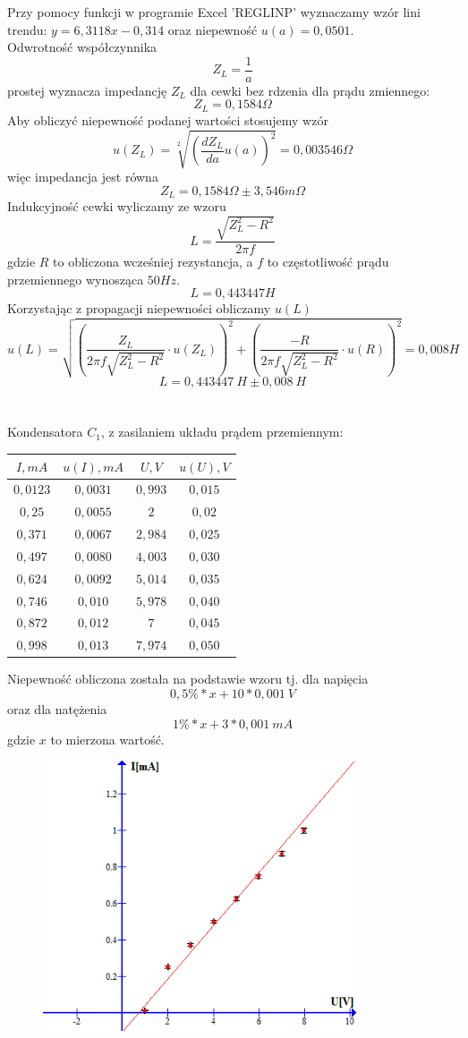 \documentclass{article}
\begin{document}
Przy pomocy funkcji w programie Excel 'REGLINP' wyznaczamy wzór lini trendu: $y = 6,3118x - 0,314$ oraz niepewność $u(a) = 0,0501$.\\
Odwrotność współczynnika 
$$Z_L = \frac{1}{a}$$
prostej wyznacza impedancję $Z_L$ dla cewki bez rdzenia dla prądu zmiennego:
$$Z_L = 0,1584 \Omega$$ 
Aby obliczyć niepewność podanej wartości stosujemy wzór
$$u(Z_L) = \sqrt[2]{(\frac{dZ_L}{da}u(a))^2} = 0,003546 \Omega$$
więc impedancja jest równa
$$Z_L = 0,1584 \Omega \pm 3,546 m \Omega$$
Indukcyjność cewki wyliczamy ze wzoru
$$L = \frac{\sqrt{Z_L^2-R^2}}{2\pi f}$$
gdzie $R$ to obliczona wcześniej rezystancja, a $f$ to częstotliwość prądu przemiennego wynosząca $50 Hz$.
$$L = 0,443447 H$$
Korzystając z propagacji niepewności obliczamy $u(L)$
$$u(L) = \sqrt{(\frac{Z_L}{2\pi f \sqrt{Z_L^2 - R^2}} \cdot u(Z_L))^2+(\frac{-R}{2\pi f \sqrt{Z_L^2-R^2}} \cdot u(R))^2} = 0,008 H$$
$$L = 0,443447\ H \pm 0,008\ H$$
\\\\
Kondensatora $C_1$, z zasilaniem układu prądem przemiennym:
\begin{center}
    \begin{tabular}{|c|c|c|c|}
    \hline
$I,mA$ & $u(I), mA$ & $U,V$ & $u(U), V$\\ \hline
$0,0123$ & $0,0031$ & $0,993$ & $0,015$\\ \hline
$0,25$ & $0,0055$ & $2$ & $0,02$\\ \hline
$0,371$ & $0,0067$ & $2,984$ & $0,025$\\ \hline
$0,497$ & $0,0080$ & $4,003$ & $0,030$\\ \hline
$0,624$ & $0,0092$ & $5,014$ & $0,035$\\ \hline
$0,746$ & $0,010$ & $5,978$ & $0,040$\\ \hline
$0,872$ & $0,012$ & $7$ & $0,045$\\ \hline
$0,998$ & $0,013$ & $7,974$ & $0,050$\\ \hline
    \end{tabular}
\end{center}
Niepewność obliczona została na podstawie wzoru tj. dla napięcia
$$0,5\% * x + 10 * 0,001\ V $$
oraz dla natężenia
$$1\% * x + 3 * 0,001\ mA$$
gdzie $x$ to mierzona wartość.
\begin{figure}[ht]
\centering
\includegraphics[height=8cm]{wykres_4.png}
\end{figure}\\
\end{document}

